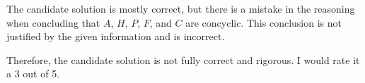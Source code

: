 The candidate solution is mostly correct, but there is a mistake in the reasoning when concluding that $A$, $H$, $P$, $F$, and $C$ are concyclic. This conclusion is not justified by the given information and is incorrect.

Therefore, the candidate solution is not fully correct and rigorous. I would rate it a 3 out of 5.
